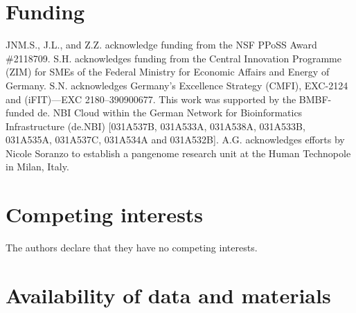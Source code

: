 \documentclass[11pt,hidelinks]{article}
\begin{document}
\section*{Funding}
JNM.S., J.L., and Z.Z. acknowledge funding from the NSF PPoSS Award \#2118709.
S.H. acknowledges funding from the Central Innovation Programme (ZIM) for SMEs of the Federal Ministry for Economic Affairs and Energy of Germany.
S.N. acknowledges Germany’s Excellence Strategy (CMFI), EXC-2124 and (iFIT)—EXC 2180–390900677.
This work was supported by the BMBF-funded de.
NBI Cloud within the German Network for Bioinformatics Infrastructure (de.NBI) [031A537B, 031A533A, 031A538A, 031A533B, 031A535A, 031A537C, 031A534A and 031A532B].
A.G. acknowledges efforts by Nicole Soranzo to establish a pangenome research unit at the Human Technopole in Milan, Italy.

\section*{Competing interests}
The authors declare that they have no competing interests.

\section*{Availability of data and materials}
\end{document}
